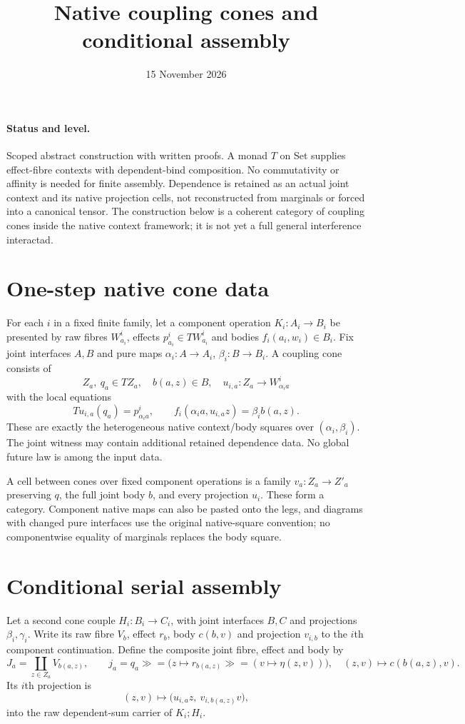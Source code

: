\documentclass[11pt]{article}
\title{Native coupling cones and conditional assembly}
\date{15 November 2026}
\begin{document}
\maketitle
\paragraph{Status and level.} Scoped abstract construction with written proofs. A monad $T$ on Set supplies effect-fibre contexts with dependent-bind composition. No commutativity or affinity is needed for finite assembly. Dependence is retained as an actual joint context and its native projection cells, not reconstructed from marginals or forced into a canonical tensor. The construction below is a coherent category of coupling cones inside the native context framework; it is not yet a full general interference interactad.

\section{One-step native cone data}
For each $i$ in a fixed finite family, let a component operation $K_i:A_i\to B_i$ be presented by raw fibres $W^i_{a_i}$, effects $p^i_{a_i}\in TW^i_{a_i}$ and bodies $f_i(a_i,w_i)\in B_i$. Fix joint interfaces $A,B$ and pure maps $\alpha_i:A\to A_i$, $\beta_i:B\to B_i$. A coupling cone consists of
\[
 Z_a,\ q_a\in TZ_a,\quad b(a,z)\in B,\quad
 u_{i,a}:Z_a\to W^i_{\alpha_i a}
\]
with the local equations
\[
 Tu_{i,a}(q_a)=p^i_{\alpha_i a},\qquad
 f_i(\alpha_i a,u_{i,a}z)=\beta_i b(a,z).\tag{C}
\]
These are exactly the heterogeneous native context/body squares over $(\alpha_i,\beta_i)$. The joint witness may contain additional retained dependence data. No global future law is among the input data.

A cell between cones over fixed component operations is a family $v_a:Z_a\to Z'_a$ preserving $q$, the full joint body $b$, and every projection $u_i$. These form a category. Component native maps can also be pasted onto the legs, and diagrams with changed pure interfaces use the original native-square convention; no componentwise equality of marginals replaces the body square.

\section{Conditional serial assembly}
Let a second cone couple $H_i:B_i\to C_i$, with joint interfaces $B,C$ and projections $\beta_i,\gamma_i$. Write its raw fibre $V_b$, effect $r_b$, body $c(b,v)$ and projection $v_{i,b}$ to the $i$th component continuation. Define the composite joint fibre, effect and body by
\[
 J_a=\coprod_{z\in Z_a}V_{b(a,z)},\qquad
 j_a=q_a\gg=\bigl(z\mapsto r_{b(a,z)}\gg=(v\mapsto\eta(z,v))\bigr),
 \quad (z,v)\mapsto c(b(a,z),v).
\]
Its $i$th projection is
\[
 (z,v)\mapsto\bigl(u_{i,a}z,\ v_{i,b(a,z)}v\bigr),\tag{P}
\]
into the raw dependent-sum carrier of $K_i;H_i$.
\end{document}

